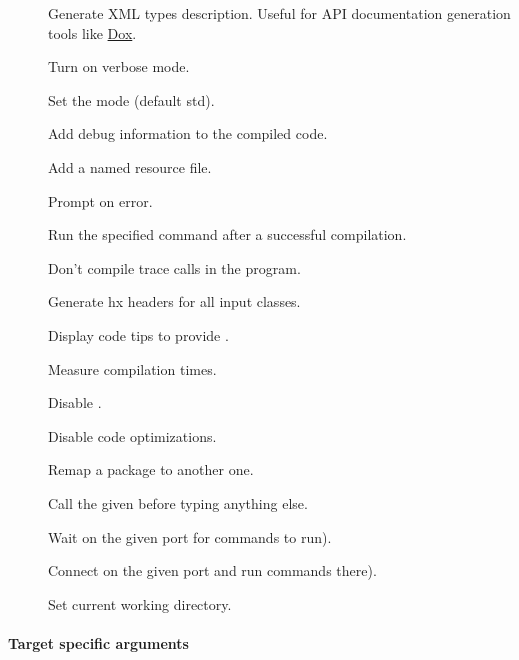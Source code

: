 \begin{description}
	\item[] Generate XML types description. Useful for API documentation generation tools like \href{https://github.com/HaxeFoundation/dox}{Dox}.
	\item[] Turn on verbose mode.
	\item[] Set the  mode (default std).
	\item[] Add debug information to the compiled code.
	\item[] Add a named resource file.
	\item[] Prompt on error.
	\item[] Run the specified command after a successful compilation.
	\item[] Don't compile trace calls in the program.
	\item[] Generate hx headers for all input classes.
	\item[] Display code tips to provide . 
	\item[] Measure compilation times.
	\item[] Disable .
	\item[] Disable code optimizations.
	\item[] Remap a package to another one.
	\item[] Call the given  before typing anything else.
	\item[] Wait on the given port for commands to run).
	\item[] Connect on the given port and run commands there).
	\item[] Set current working directory.
\end{description}

\paragraph{Target specific arguments}


